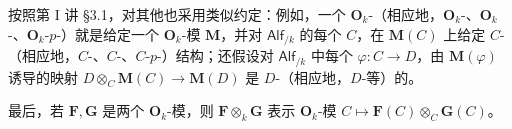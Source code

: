 按照第 I 讲 \S3.1，对其他也采用类似约定：例如，一个 $\mathbf O_k$-（相应地，$\mathbf O_k$-、$\mathbf O_k$-、$\mathbf O_k$-$p$-）就是给定一个 $\mathbf O_k$-模 $\mathbf M$，并对 $\mathsf{Alf}_{/k}$ 的每个 $C$，在 $\mathbf M(C)$ 上给定 $C$-（相应地，$C$-、$C$-、$C$-$p$-）结构；还假设对 $\mathsf{Alf}_{/k}$ 中每个 $\varphi:C\to D$，由 $\mathbf M(\varphi)$ 诱导的映射 $D\otimes_C\mathbf M(C)\to\mathbf M(D)$ 是 $D$-（相应地，$D$-等）的。

最后，若 $\mathbf F,\mathbf G$ 是两个 $\mathbf O_k$-模，则 $\mathbf F\otimes_k\mathbf G$ 表示 $\mathbf O_k$-模 $C\mapsto\mathbf F(C)\otimes_C\mathbf G(C)$。

